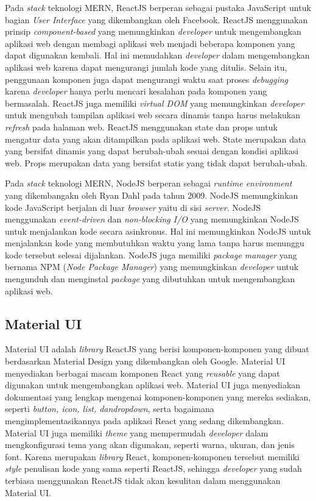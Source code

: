 Pada \textit{stack} teknologi MERN, ReactJS berperan sebagai pustaka JavaScript untuk bagian \textit{User Interface} 
yang dikembangkan oleh Facebook. ReactJS menggunakan prinsip \textit{component-based} yang memungkinkan \textit{developer} 
untuk mengembangkan aplikasi web dengan membagi aplikasi web menjadi beberapa komponen yang dapat digunakan 
kembali. Hal ini memudahkan \textit{developer} dalam mengembangkan aplikasi web karena dapat mengurangi 
jumlah kode yang ditulis. Selain itu, penggunaan komponen juga dapat mengurangi waktu saat proses 
\textit{debugging} karena \textit{developer} hanya perlu mencari kesalahan pada komponen yang bermasalah.
ReactJS juga memiliki \textit{virtual DOM} yang memungkinkan \textit{developer}
untuk mengubah tampilan aplikasi web secara dinamis tanpa harus melakukan \textit{refresh} pada halaman web\cite{dinku_reactjs_2022}. 
ReactJS menggunakan state dan props untuk mengatur data yang akan ditampilkan pada aplikasi web. 
State merupakan data yang bersifat dinamis yang dapat berubah-ubah sesuai dengan kondisi aplikasi web. 
Props merupakan data yang bersifat statis yang tidak dapat berubah-ubah.

Pada \textit{stack} teknologi MERN, NodeJS berperan sebagai \textit{runtime environment} yang 
dikembangakn oleh Ryan Dahl pada tahun 2009. NodeJS memungkinkan kode JavaScript berjalan di luar \textit{browser} yaitu di sisi \textit{server}. 
NodeJS menggunakan \textit{event-driven} dan \textit{non-blocking I/O} yang memungkinkan NodeJS 
untuk menjalankan kode secara asinkronus. Hal ini memungkinkan NodeJS untuk menjalankan kode 
yang membutuhkan waktu yang lama tanpa harus menunggu kode tersebut selesai dijalankan. 
NodeJS juga memiliki \textit{package manager} yang bernama NPM (\textit{Node Package Manager}) 
yang memungkinkan \textit{developer} untuk mengunduh dan menginstal \textit{package} yang dibutuhkan 
untuk mengembangkan aplikasi web. \cite{rimal_developing_2019}

\subsection{Material UI}
Material UI adalah \textit{library} ReactJS yang berisi komponen-komponen yang dibuat berdasarkan Material Design 
yang dikembangkan oleh Google\cite{mannila_sales_2022}. Material UI menyediakan berbagai macam komponen React yang \textit{reusable}
yang dapat digunakan untuk mengembangkan aplikasi web. Material UI juga menyediakan dokumentasi yang lengkap 
mengenai komponen-komponen yang mereka sediakan, seperti \textit{button, icon, list, \emph{dan}dropdown},
serta bagaimana mengimplementasikannya pada aplikasi React yang sedang dikembangkan. 
Material UI juga memiliki \textit{theme} yang mempermudah \textit{developer} 
dalam mengkonfigurasi tema yang akan digunakan, seperti warna, ukuran, dan jenis font. 
Karena merupakan \textit{library} React, komponen-komponen tersebut memiliki \textit{style} 
penulisan kode yang sama seperti ReactJS, sehingga \textit{developer} yang sudah terbiasa 
menggunakan ReactJS tidak akan kesulitan dalam menggunakan Material UI.

